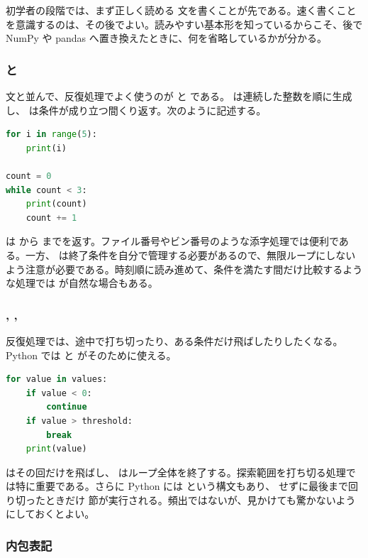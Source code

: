 初学者の段階では、まず正しく読める  文を書くことが先である。速く書くことを意識するのは、その後でよい。読みやすい基本形を知っているからこそ、後で NumPy や pandas へ置き換えたときに、何を省略しているかが分かる。

\subsubsection{ と }

 文と並んで、反復処理でよく使うのが  と  である。 は連続した整数を順に生成し、 は条件が成り立つ間くり返す。次のように記述する。

\begin{lstlisting}[language=Python]
for i in range(5):
    print(i)

count = 0
while count < 3:
    print(count)
    count += 1
\end{lstlisting}

 は  から  までを返す。ファイル番号やビン番号のような添字処理では便利である。一方、 は終了条件を自分で管理する必要があるので、無限ループにしないよう注意が必要である。時刻順に読み進めて、条件を満たす間だけ比較するような処理では  が自然な場合もある。

\subsubsection{, , }

反復処理では、途中で打ち切ったり、ある条件だけ飛ばしたりしたくなる。Python では  と  がそのために使える。

\begin{lstlisting}[language=Python]
for value in values:
    if value < 0:
        continue
    if value > threshold:
        break
    print(value)
\end{lstlisting}

 はその回だけを飛ばし、 はループ全体を終了する。探索範囲を打ち切る処理では特に重要である。さらに Python には  という構文もあり、 せずに最後まで回り切ったときだけ  節が実行される。頻出ではないが、見かけても驚かないようにしておくとよい。

\subsubsection{内包表記}

